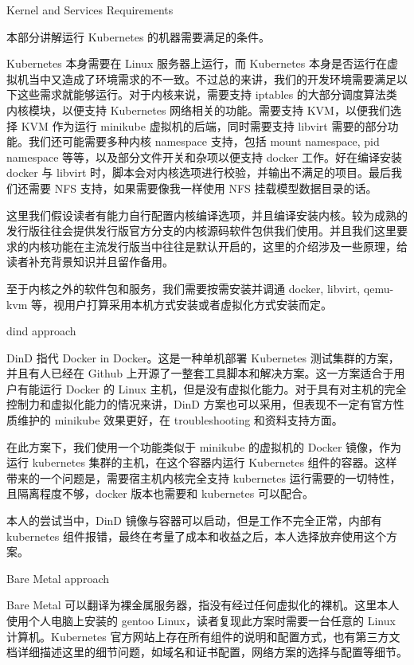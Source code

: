 
Kernel and Services Requirements

本部分讲解运行 Kubernetes 的机器需要满足的条件。

Kubernetes 本身需要在 Linux 服务器上运行，而 Kubernetes 本身是否运行在虚拟机当中又造成了环境需求的不一致。不过总的来讲，我们的开发环境需要满足以下这些需求就能够运行。对于内核来说，需要支持 iptables 的大部分调度算法类内核模块，以便支持 Kubernetes 网络相关的功能。需要支持 KVM，以便我们选择 KVM 作为运行 minikube 虚拟机的后端，同时需要支持 libvirt 需要的部分功能。我们还可能需要多种内核 namespace 支持，包括 mount namespace, pid namespace 等等，以及部分文件开关和杂项以便支持 docker 工作。好在编译安装 docker 与 libvirt 时，脚本会对内核选项进行校验，并输出不满足的项目。最后我们还需要 NFS 支持，如果需要像我一样使用 NFS 挂载模型数据目录的话。

这里我们假设读者有能力自行配置内核编译选项，并且编译安装内核。较为成熟的发行版往往会提供发行版官方分支的内核源码软件包供我们使用。并且我们这里要求的内核功能在主流发行版当中往往是默认开启的，这里的介绍涉及一些原理，给读者补充背景知识并且留作备用。

至于内核之外的软件包和服务，我们需要按需安装并调通 docker, libvirt, qemu-kvm 等，视用户打算采用本机方式安装或者虚拟化方式安装而定。


dind approach

DinD 指代 Docker in Docker。这是一种单机部署 Kubernetes 测试集群的方案，并且有人已经在 Github 上开源了一整套工具脚本和解决方案。这一方案适合于用户有能运行 Docker 的 Linux 主机，但是没有虚拟化能力。对于具有对主机的完全控制力和虚拟化能力的情况来讲，DinD 方案也可以采用，但表现不一定有官方性质维护的 minikube 效果更好，在 troubleshooting 和资料支持方面。

在此方案下，我们使用一个功能类似于 minikube 的虚拟机的 Docker 镜像，作为运行 kubernetes 集群的主机，在这个容器内运行 Kubernetes 组件的容器。这样带来的一个问题是，需要宿主机内核完全支持 kubernetes 运行需要的一切特性，且隔离程度不够，docker 版本也需要和 kubernetes 可以配合。

本人的尝试当中，DinD 镜像与容器可以启动，但是工作不完全正常，内部有 kubernetes 组件报错，最终在考量了成本和收益之后，本人选择放弃使用这个方案。

Bare Metal approach

Bare Metal 可以翻译为裸金属服务器，指没有经过任何虚拟化的裸机。这里本人使用个人电脑上安装的 gentoo Linux，读者复现此方案时需要一台任意的 Linux 计算机。Kubernetes 官方网站上存在所有组件的说明和配置方式，也有第三方文档详细描述这里的细节问题，如域名和证书配置，网络方案的选择与配置等细节。

